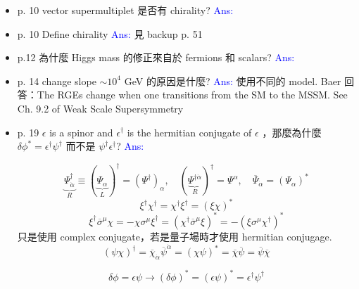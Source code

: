 \documentclass[12pt, letterpaper]{article}
\begin{document}
\begin{itemize}
\item p. 10\newline
vector supermultiplet 是否有 chirality?\newline
\textcolor{blue}{Ans:}

\item p. 10\newline
Define chirality\newline
\textcolor{blue}{Ans:} 見 backup p. 51

\item p.12\newline
為什麼 Higgs mass 的修正來自於 fermions 和 scalars?\newline
\textcolor{blue}{Ans:}

\item p. 14\newline
change slope $\sim 10^{4}$ GeV 的原因是什麼?\newline
\textcolor{blue}{Ans:} 使用不同的 model. Baer 回答：The RGEs change when one transitions from the SM to the MSSM. See Ch. 9.2 of Weak Scale Supersymmetry

\item p. 19\newline
$\epsilon$ is a spinor and $\epsilon^{\dag}$ is the hermitian conjugate of $\epsilon$ ，那麼為什麼 $\delta \phi^{*} = \epsilon^{\dag} \psi^{\dag}$ 而不是 $\psi^{\dag} \epsilon^{\dag}$?\newline
\textcolor{blue}{Ans:}
\begin{framed}
\begin{equation*}
\underbrace{\Psi^{\dag}_{\dot{\alpha}}}_{R} \equiv (\underbrace{\Psi_{\alpha}}_{L})^{\dag} = (\Psi^{\dag})_{\alpha}, \quad (\underbrace{\Psi^{\dag \dot{\alpha}}}_{R})^{\dag} = \Psi^{\alpha}, \quad \overline{\Psi}_{\dot{\alpha}} = (\Psi_{\alpha})^{*}
\end{equation*}
\begin{equation*}
\xi^{\dag} \chi^{\dag} = \chi^{\dag} \xi^{\dag} = (\xi \chi)^{*}
\end{equation*}
\begin{equation*}
\xi^{\dag} \overline{\sigma}^{\mu} \chi = - \chi \sigma^{\mu} \xi^{\dag} = (\chi^{\dag} \overline{\sigma}^{\mu} \xi)^{*} = - (\xi \sigma^{\mu} \chi^{\dag})^{*}
\end{equation*}
只是使用 complex conjugate，若是量子場時才使用 hermitian conjugage.
\begin{equation*}
(\psi \chi)^{\dag} = \overline{\chi}_{\dot{\alpha}} \overline{\psi}^{\dot{\alpha}} = (\chi \psi)^{*} = \overline{\chi} \overline{\psi} = \overline{\psi} \overline{\chi}
\end{equation*}
\end{framed}
\begin{equation*}
\delta \phi = \epsilon \psi \rightarrow (\delta \phi)^{*} = (\epsilon \psi)^{*} = \epsilon^{\dag} \psi^{\dag}
\end{equation*}


\end{itemize}
\end{document}
